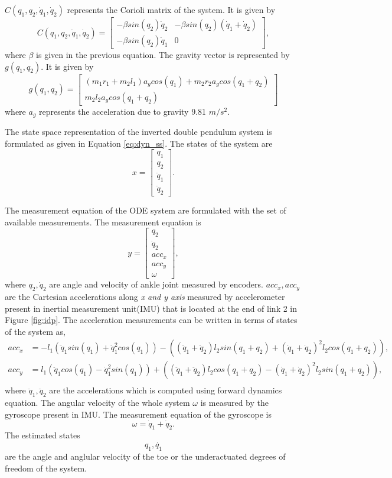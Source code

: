 $C(q_1,q_2,\dot{q}_1,\dot{q}_2)$ represents the Corioli matrix of the system. It is given by 
$$C(q_1,q_2,\dot{q}_1,\dot{q}_2) = 
\begin{bmatrix}
-\beta sin(q_2) \dot{q}_2 &-\beta sin(q_2)(\dot{q}_1 + \dot{q}_2) \\
-\beta sin(q_2) \dot{q}_1 & 0
\end{bmatrix},
$$
where $\beta$ is given in the previous equation. The gravity vector is represented by $g(q_1,q_2)$. It is given by
$$g(q_1,q_2) = 
\begin{bmatrix}
(m_1 r_1 +m_2 l_1)a_g cos(q_1) + m_2 r_2 a_g cos(q_1+q_2) \\
m_2 l_2 a_g cos(q_1+q_2)
\end{bmatrix}
$$
where $a_g$ represents the acceleration due to gravity 9.81 $m/{s}^2$.

The state space representation of the inverted double pendulum system is formulated as given in Equation \ref{eq:dyn_ss}. The states of the system are $$ x = \begin{bmatrix} q_1 \\ q_2 \\ \dot q_1  \\ \dot q_2 \end{bmatrix}. $$

The measurement equation of the ODE system are formulated with the set of available measurements. The measurement equation is  
\begin{equation}
    \label{eq:y_idp}
	y= \begin{bmatrix} q_2 \\ \dot q_2 \\ acc_x \\ acc_y \\ \omega \end{bmatrix},
\end{equation}
where $q_2, \dot{q}_2$ are  angle and velocity of ankle joint measured by encoders. $acc_{x},acc_{y} $ are the Cartesian accelerations along \emph{x and y axis} measured by accelerometer present in inertial measurement unit(IMU) that is located at the end of link 2 in Figure \ref{fig:idp}. The acceleration measurements can be written in terms of states of the system as,
$$ 
    \begin{aligned}
    acc_x &= -l_1 (\ddot q_1 sin(q_1) + \dot q_1^2 cos(q_1)) - ((\ddot q_1 + \ddot q_2) l_2 sin(q_1+q_2) + (\dot q_1 + \dot q_2)^2 l_2 cos(q_1+q_2)), \\
    acc_y &= l_1 (\ddot q_1 cos(q_1) - \dot q_1^2 sin(q_1)) + ((\ddot q_1 + \ddot q_2) l_2 cos(q_1+q_2) - (\dot q_1 + \dot q_2)^2 l_2 sin(q_1+q_2)), \\
    \end{aligned}
$$
where $\ddot q_1 , \ddot q_2 $ are the accelerations which is computed using forward dynamics equation. The angular velocity of the whole system $\omega$ is measured by the gyroscope present in IMU. The measurement equation of the gyroscope is $$ \omega = \dot q_1 + \dot q_2. $$ 
The estimated states $$q_1, \dot{q_1}$$ are the angle and anglular velocity of the toe or the underactuated degrees of freedom of the system.


